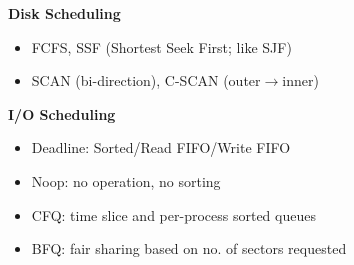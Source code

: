 \documentclass[a4paper, 12pt]{article}
\begin{document}
\begin{multicols*}{4}
\begin{enumerate}
\end{enumerate}
\textbf{Disk Scheduling}
\begin{itemize}
	\item FCFS, SSF (Shortest Seek First; like SJF)
	\item SCAN (bi-direction), C-SCAN (outer$\rightarrow$inner)
\end{itemize}
\textbf{I/O Scheduling}
\begin{itemize}
	\item Deadline: Sorted/Read FIFO/Write FIFO
	\item Noop: no operation, no sorting
	\item CFQ: time slice and per-process sorted queues
	\item BFQ: fair sharing based on no. of sectors requested
\end{itemize}

\medskip


\end{multicols*}
\end{document}
